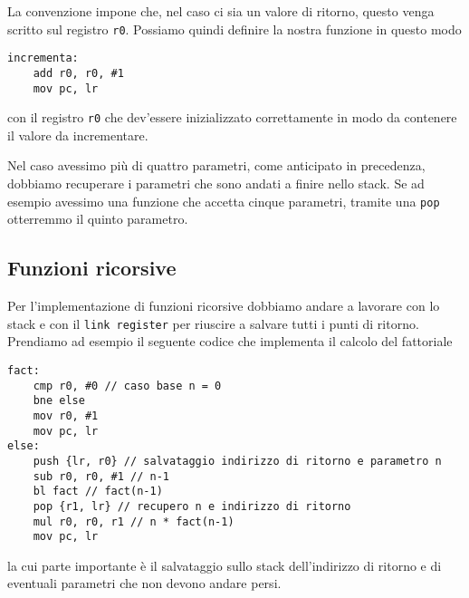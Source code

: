 La convenzione impone che, nel caso ci sia un valore di ritorno, questo venga scritto sul registro
\verb|r0|. Possiamo quindi definire la nostra funzione in questo modo
\begin{verbatim}
incrementa:
	add r0, r0, #1
	mov pc, lr
\end{verbatim}
con il registro \verb|r0| che dev'essere inizializzato correttamente in modo da contenere il valore
da incrementare.

Nel caso avessimo più di quattro parametri, come anticipato in precedenza, dobbiamo recuperare i
parametri che sono andati a finire nello stack. Se ad esempio avessimo una funzione che accetta
cinque parametri, tramite una \verb|pop| otterremmo il quinto parametro.

\subsection{Funzioni ricorsive}
Per l'implementazione di funzioni ricorsive dobbiamo andare a lavorare con lo stack e con il
\verb|link register| per riuscire a salvare tutti i punti di ritorno. Prendiamo ad esempio il
seguente codice che implementa il calcolo del fattoriale
\begin{verbatim}
fact:
	cmp r0, #0 // caso base n = 0
	bne else
	mov r0, #1
	mov pc, lr
else:
	push {lr, r0} // salvataggio indirizzo di ritorno e parametro n
	sub r0, r0, #1 // n-1
	bl fact // fact(n-1)
	pop {r1, lr} // recupero n e indirizzo di ritorno
	mul r0, r0, r1 // n * fact(n-1)
	mov pc, lr
\end{verbatim}
la cui parte importante è il salvataggio sullo stack dell'indirizzo di ritorno e di eventuali
parametri che non devono andare persi.
